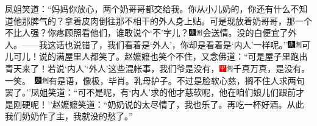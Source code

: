 凤姐笑道：``妈妈你放心，两个奶哥哥都交给我。你从小儿奶的，你还有什么不知道他那脾气的？拿着皮肉倒往那不相干的外人身上贴。可是现放着奶哥哥，那一个不比人强？你疼顾照看他们，谁敢说个`不'字儿？{\includegraphics[width=3mm]{../Images/00004}\includegraphics[width=3mm]{../Images/00011}\footnotesize \kaishu 会送情。}没的白便宜了外人。------我这话也说错了，我们看着是`外人'，你却是看着是`内人'一样呢。''{\includegraphics[width=3mm]{../Images/00004}\includegraphics[width=3mm]{../Images/00011}\footnotesize \kaishu 可儿可儿！}说的满屋里人都笑了。赵嬷嬷也笑个不住，又念佛道：``可是屋子里跑出青天来了！若说`内人'`外人'这些混帐事，我们爷是没有，{\includegraphics[width=3mm]{../Images/00002}\includegraphics[width=3mm]{../Images/00011}\footnotesize \kaishu 千真万真，是没有。一笑。　\includegraphics[width=3mm]{../Images/00004}\includegraphics[width=3mm]{../Images/00011}\footnotesize \kaishu 有是语，像极，毕肖。乳母护子。}不过是脸软心慈，搁不住人求两句罢了。''凤姐笑道：``可不是呢，有`内人'求的他才慈软呢，他在咱们娘儿们跟前才是刚硬呢！''赵嬷嬷笑道：``奶奶说的太尽情了，我也乐了。再吃一杯好酒。从此我们奶奶作了主，我就没的愁了。''


